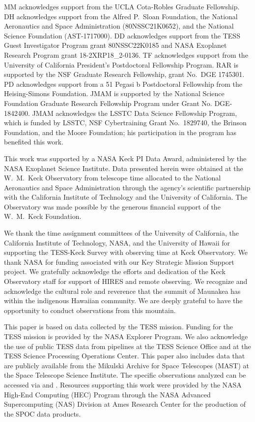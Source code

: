 \documentclass[twocolumn]{aastex63}
\begin{document}
\begin{acknowledgments}

MM acknowledges support from the UCLA Cota-Robles Graduate Fellowship. DH acknowledges support from the Alfred P.\ Sloan Foundation, the National Aeronautics and Space Administration (80NSSC21K0652), and the National Science Foundation (AST-1717000). DD acknowledges support from the TESS Guest Investigator Program grant 80NSSC22K0185 and NASA Exoplanet Research Program grant 18-2XRP18\_2-0136. TF acknowledges support from the University of California President's Postdoctoral Fellowship Program. RAR is supported by the NSF Graduate Research Fellowship, grant No.\ DGE 1745301. PD acknowledges support from a 51 Pegasi b Postdoctoral Fellowship from the Heising-Simons Foundation. JMAM is supported by the National Science Foundation Graduate Research Fellowship Program under Grant No. DGE-1842400. JMAM acknowledges the LSSTC Data Science Fellowship Program, which is funded by LSSTC, NSF Cybertraining Grant No.\ 1829740, the Brinson Foundation, and the Moore Foundation; his participation in the program has benefited this work. 

This work was supported by a NASA Keck PI Data Award, administered by the NASA Exoplanet Science Institute. Data presented herein were obtained at the W.\ M.\ Keck Observatory from telescope time allocated to the National Aeronautics and Space Administration through the agency's scientific partnership with the California Institute of Technology and the University of California. The Observatory was made possible by the generous financial support of the W.\ M.\ Keck Foundation.

We thank the time assignment committees of the University of California, the California Institute of Technology, NASA, and the University of Hawaii for supporting the TESS-Keck Survey with observing time at Keck Observatory.  We thank NASA for funding associated with our Key Strategic Mission Support project.  We gratefully acknowledge the efforts and dedication of the Keck Observatory staff for support of HIRES and remote observing.  We recognize and acknowledge the cultural role and reverence that the summit of Maunakea has within the indigenous Hawaiian community. We are deeply grateful to have the opportunity to conduct observations from this mountain.  

This paper is based on data collected by the TESS mission. Funding for the TESS mission is provided by the NASA Explorer Program. We also acknowledge the use of public TESS data from pipelines at the TESS Science Office and at the TESS Science Processing Operations Center. This paper also includes data that are publicly available from the Mikulski Archive for Space Telescopes (MAST) at the Space Telescope Science Institute. The specific observations analyzed can be accessed via  and . Resources supporting this work were provided by the NASA High-End Computing (HEC) Program through the NASA Advanced Supercomputing (NAS) Division at Ames Research Center for the production of the SPOC data products. 
\end{acknowledgments}
\end{document}
